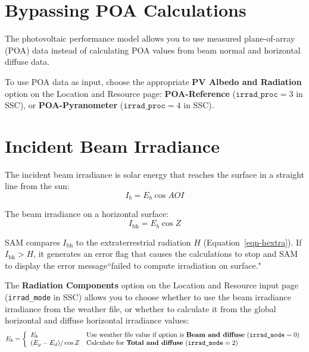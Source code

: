 \documentclass[12pt,letterpaper]{article}
\newcommand\AOI{\ensuremath{\mathit{AOI}}}
\begin{document}
\section{Bypassing POA Calculations}

The photovoltaic performance model allows you to use measured plane-of-array (POA) data instead of calculating POA values from beam normal and horizontal diffuse data. 

To use POA data as input, choose the appropriate \textbf{PV Albedo and Radiation} option on the Location and Resource page: \textbf{POA-Reference} ($\texttt{irrad\_proc}=3$ in SSC), or \textbf{POA-Pyranometer} ($\texttt{irrad\_proc}=4$ in SSC).

\section{Incident Beam Irradiance}\label{sec-incidentbeam}

The incident beam irradiance is solar energy that reaches the surface in a straight line from the sun:
\begin{equation}
I_b = E_b\cos\AOI
\end{equation}

The beam irradiance on a horizontal surface:
\begin{equation}\label{eqn-hbeam}
I_{\mathrm{bh}}=E_b\cos Z
\end{equation}

SAM compares $I_{\mathrm{bh}}$ to the extraterrestrial radiation $H$ (Equation~\ref{eqn-hextra}). If $I_{\mathrm{bh}}>H$, it generates an error flag that causes the calculations to stop and SAM to display the error message``failed to compute irradiation on surface."

The \textbf{Radiation Components} option on the Location and Resource input page (\texttt{irrad\_mode} in SSC) allows you to choose whether to use the beam irradiance  irradiance from the weather file, or whether to calculate it from the global horizontal and diffuse horizontal irradiance values:
\begin{equation}\label{eqn-beam}
E_b = \left\{
\begin{array}{ll}
E_b & \text{Use weather file value if option is \textbf{Beam and diffuse} ($\texttt{irrad\_mode}=0)$}\\
(E_g - E_d)/\cos Z & \text{Calculate for \textbf{Total and diffuse} ($\texttt{irrad\_mode}=2)$}
\end{array}
\right.
\end{equation}
\end{document}
